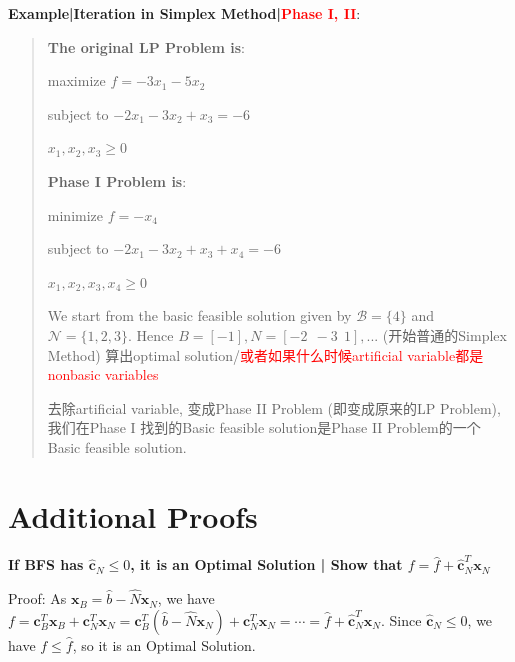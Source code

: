 \documentclass[9pt]{article}
\begin{document}
\textbf{Example|Iteration in Simplex Method|\textcolor{red}{Phase I, II}}:
\vspace{-10pt}
\begin{multicols}{2}
\begin{quote}
    \color{gray}
    \fontsize{7pt}{4pt}\selectfont
    \vspace{5pt}
    \textbf{The original LP Problem is}:
    
    \qquad maximize \( f= -3x_1 - 5x_2 \)

    \qquad subject to \( -2x_1 -3x_2 + x_3 = -6 \)

    \qquad \( x_1, x_2, x_3 \geq 0 \)
    
    \textbf{Phase I Problem is}:
    
    \qquad minimize \( f= -x_4 \)
    
    \qquad subject to \( -2x_1 -3x_2 + x_3 + x_4 = -6 \)
    
    \qquad \( x_1, x_2, x_3, x_4 \geq 0 \)

    \columnbreak

    We start from the basic feasible solution given by $\mathcal{B}=\{4\}$ and $\mathcal{N}=\{1,2,3\}$. Hence $B=[-1], N = [-2 \ \ -3 \ \ 1 ],...$ (开始普通的Simplex Method) 算出optimal solution/\textcolor{red}{或者如果什么时候artificial variable都是nonbasic variables}

    去除artificial variable, 变成Phase II Problem (即变成原来的LP Problem), 我们在Phase I 找到的Basic feasible solution是Phase II Problem的一个Basic feasible solution.

\end{quote}
\end{multicols}
\vspace{-10pt}


\section{Additional Proofs}

\scriptsize

\textbf{If BFS has $\widehat{\mathbf{c}}_N\leq0$, it is an \textbf{Optimal Solution} | Show that $f=\widehat{f}+\widehat{\mathbf{c}}_N^T\mathbf{x}_N$}

Proof: As $\mathbf{x}_B=\widehat{b}-\widehat{N}\mathbf{x}_N$, we have $f=\mathbf{c}_B^T\mathbf{x}_B+\mathbf{c}_N^T\mathbf{x}_N=\mathbf{c}_B^T(\widehat{b}-\widehat{N}\mathbf{x}_N)+\mathbf{c}_N^T\mathbf{x}_N=\cdots=\widehat{f}+\widehat{\mathbf{c}}_N^T\mathbf{x}_N$.
Since $\widehat{\mathbf{c}}_N\leq0$, we have $f\leq\widehat{f}$, so it is an Optimal Solution.
\end{document}
